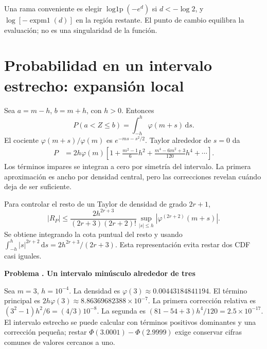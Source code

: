 \documentclass[11pt,a4paper]{article}
\newcommand{\dd}{\,\mathrm d}
\theoremstyle{definition}
\DeclareMathOperator{\expmone}{expm1}
\DeclareMathOperator{\logonep}{log1p}
\newcounter{problema}
\newenvironment{resuelto}[1]{\refstepcounter{problema}\par\medskip\Needspace{6\baselineskip}\textbf{Problema \theproblema. #1}\par}{\par\medskip}
\begin{document}
Una rama conveniente es elegir $\logonep(-e^d)$ si $d<-\log2$, y $\log[-\expmone(d)]$ en la región restante. El punto de cambio equilibra la evaluación; no es una singularidad de la función.

\section{Probabilidad en un intervalo estrecho: expansión local}
Sea $a=m-h$, $b=m+h$, con $h>0$. Entonces
\[
P(a<Z\le b)=\int_{-h}^h\varphi(m+s)\dd s.
\]
El cociente $\varphi(m+s)/\varphi(m)$ es
$e^{-ms-s^2/2}$.
Taylor alrededor de $s=0$ da
\[
\begin{aligned}
P&=2h\varphi(m)\left[
1+\frac{m^2-1}{6}h^2+
\frac{m^4-6m^2+3}{120}h^4+\cdots\right].
\end{aligned}
\]
Los términos impares se integran a cero por simetría del intervalo.
La primera aproximación es ancho por densidad central, pero las correcciones revelan cuándo deja de ser suficiente.

Para controlar el resto de un Taylor de densidad de grado $2r+1$,
\[
|R_P|\le
\frac{2h^{2r+3}}{(2r+3)(2r+2)!}
\sup_{|s|\le h}|\varphi^{(2r+2)}(m+s)|.
\]
Se obtiene integrando la cota puntual del resto y usando
$\int_{-h}^h|s|^{2r+2}\dd s=2h^{2r+3}/(2r+3)$.
Esta representación evita restar dos CDF casi iguales.

\begin{resuelto}{Un intervalo minúsculo alrededor de tres}
Sea $m=3$, $h=10^{-4}$. La densidad es
$\varphi(3)\approx0.00443184841194$.
El término principal es
$2h\varphi(3)\approx8.86369682388\times10^{-7}$.
La primera corrección relativa es
$(3^2-1)h^2/6=(4/3)10^{-8}$.
La segunda es
$(81-54+3)h^4/120=2.5\times10^{-17}$.
El intervalo estrecho se puede calcular con términos positivos dominantes y una corrección pequeña; restar $\Phi(3.0001)-\Phi(2.9999)$ exige conservar cifras comunes de valores cercanos a uno.
\end{resuelto}
\end{document}
